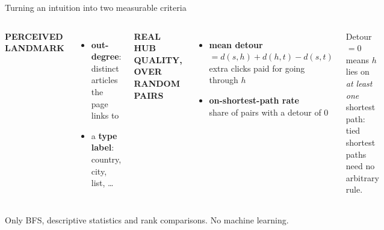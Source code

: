 \documentclass[aspectratio=169,10pt]{beamer}
\newcommand{\kicker}[1]{{\footnotesize\bfseries\color{accent}\MakeUppercase{#1}}\\[2pt]}
\newcommand{\muted}[1]{{\color{ink2}#1}}
\newcommand{\takeaway}[1]{\vfill{\setlength{\fboxsep}{6pt}\colorbox{panel}{\parbox{\dimexpr\linewidth-12pt}{\small #1}}}}
\begin{document}
\begin{frame}{Turning an intuition into two measurable criteria}
\begin{columns}[T,onlytextwidth]
\kicker{Perceived landmark}
\begin{itemize}
  \item \textbf{out-degree}: distinct articles the page links to
  \item a \textbf{type label}: country, city, list, \dots
\end{itemize}
\vspace{0.3cm}
\kicker{Real hub quality, over random pairs}
\begin{itemize}
  \item \textbf{mean detour} $= d(s,h)+d(h,t)-d(s,t)$\\ \muted{extra clicks paid for going through $h$}
  \item \textbf{on-shortest-path rate}\\ \muted{share of pairs with a detour of 0}
\end{itemize}
\centering
{}

\vspace{0.3cm}
{\footnotesize\muted{Detour $= 0$ means $h$ lies on \emph{at least one} shortest path:\\tied shortest paths need no arbitrary rule.}}
\end{columns}
\takeaway{Only BFS, descriptive statistics and rank comparisons. No machine learning.}
\end{frame}
\end{document}
